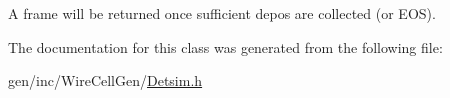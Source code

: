 A frame will be returned once sufficient depos are collected (or E\+OS). 



The documentation for this class was generated from the following file\+:\begin{DoxyCompactItemize}
\item 
gen/inc/\+Wire\+Cell\+Gen/\hyperlink{_detsim_8h}{Detsim.\+h}\end{DoxyCompactItemize}
